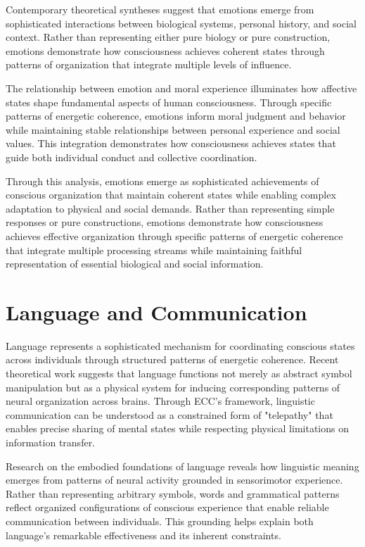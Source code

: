 \begin{refsection}
Contemporary theoretical syntheses \cite{Wentworth1992} suggest that emotions emerge from sophisticated interactions between biological systems, personal history, and social context. Rather than representing either pure biology or pure construction, emotions demonstrate how consciousness achieves coherent states through patterns of organization that integrate multiple levels of influence.

The relationship between emotion and moral experience \cite{LeDoux2015} illuminates how affective states shape fundamental aspects of human consciousness. Through specific patterns of energetic coherence, emotions inform moral judgment and behavior while maintaining stable relationships between personal experience and social values. This integration demonstrates how consciousness achieves states that guide both individual conduct and collective coordination.

Through this analysis, emotions emerge as sophisticated achievements of conscious organization that maintain coherent states while enabling complex adaptation to physical and social demands. Rather than representing simple responses or pure constructions, emotions demonstrate how consciousness achieves effective organization through specific patterns of energetic coherence that integrate multiple processing streams while maintaining faithful representation of essential biological and social information.

\section{Language and Communication}

Language represents a sophisticated mechanism for coordinating conscious states across individuals through structured patterns of energetic coherence. Recent theoretical work \cite{Feldman2008} suggests that language functions not merely as abstract symbol manipulation but as a physical system for inducing corresponding patterns of neural organization across brains. Through ECC's framework, linguistic communication can be understood as a constrained form of "telepathy" that enables precise sharing of mental states while respecting physical limitations on information transfer.

Research on the embodied foundations of language \cite{Barsalou2008} reveals how linguistic meaning emerges from patterns of neural activity grounded in sensorimotor experience. Rather than representing arbitrary symbols, words and grammatical patterns reflect organized configurations of conscious experience that enable reliable communication between individuals. This grounding helps explain both language's remarkable effectiveness and its inherent constraints.


\end{refsection}
